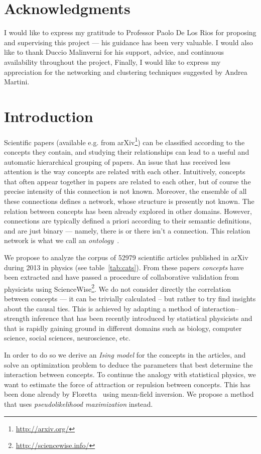 \documentclass[a4paper,12pt,twoside]{article}
\begin{document}
\section*{Acknowledgments}
I would like to express my gratitude to Professor Paolo De Los Rios for proposing and supervising this project --- his guidance has been very valuable. I would also like to thank Duccio Malinverni  for his support, advice, and continuous availability throughout the project,
Finally, I would like to express my appreciation for the networking and clustering techniques suggested by Andrea Martini.
{\hypersetup{linkcolor=black}
\small
\tableofcontents
}
\newpage
\section{Introduction}

Scientific papers (available e.g. from arXiv\footnote{\url{http://arxiv.org/}}) can be classified according to the concepts they contain, and studying their relationships can lead to a useful and automatic hierarchical grouping of papers.
An issue that has received less attention is the way concepts are related with each other.
Intuitively, concepts that often appear together in papers are related to each other, but of course the precise intensity of this connection is not known.
Moreover, the ensemble of all these connections defines a network, whose structure is presently not known.
The relation between concepts has been already explored in other domains. However, connections are typically defined a priori according to their semantic definitions, and are just binary --- namely, there is or there isn't a connection. This relation network is what we call an {\em ontology}~\cite{guarino1998}.

We propose to analyze the corpus of 52979 scientific articles published in arXiv during 2013 in physics (see table~\ref{tab:cats}).
From these papers {\em concepts} have been extracted and have passed a procedure of collaborative validation from physicists using ScienceWise\footnote{\url{http://sciencewise.info/}}.
We do not consider directly the correlation between concepts --- it can be trivially calculated --  but rather to try find insights about the causal ties.
This is achieved by adapting a method of interaction--strength inference that has been recently introduced by statistical physicists and that is rapidly gaining ground in different domains such as biology, computer science, social sciences, neuroscience, etc.

In order to do so we derive an {\em Ising model} for the concepts in the articles, and solve an optimization problem to deduce the parameters that best determine the interaction between concepts.
To continue the analogy with statistical physics, we want to estimate the force of attraction or repulsion between concepts.
This has been done already by Floretta~\cite{flo2014} using mean-field inversion.
We propose a method that uses {\em pseudolikelihood maximization} instead.
\end{document}
